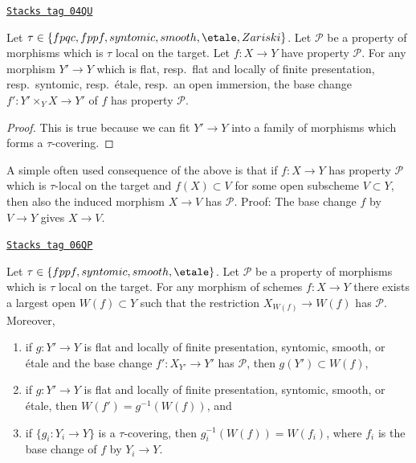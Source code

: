 \begin{lemma}
\label{descent-lemma-pullback-property-local-target}
\href{https://stacks.math.columbia.edu/tag/04QU}{\texttt{Stacks tag 04QU}}

Let $\tau \in \{fpqc, fppf, syntomic, smooth, \etale, Zariski\}$.
Let $\mathcal{P}$ be a property of morphisms which is $\tau$ local
on the target. Let $f : X \to Y$ have property $\mathcal{P}$.
For any morphism $Y' \to Y$ which is
flat, resp.\ flat and locally of finite presentation, resp.\ syntomic,
resp.\ \'etale, resp.\ an open immersion, the base change
$f' : Y' \times_Y X \to Y'$ of $f$ has property $\mathcal{P}$.
\end{lemma}

\begin{proof}
This is true because we can fit $Y' \to Y$ into a family of
morphisms which forms a $\tau$-covering.
\end{proof}

A simple often used consequence of the above is that if
$f : X \to Y$ has property $\mathcal{P}$ which is $\tau$-local
on the target and $f(X) \subset V$
for some open subscheme $V \subset Y$, then also the induced
morphism $X \to V$ has $\mathcal{P}$. Proof: The base change
$f$ by $V \to Y$ gives $X \to V$.

\begin{lemma}
\label{descent-lemma-largest-open-of-the-base}
\href{https://stacks.math.columbia.edu/tag/06QP}{\texttt{Stacks tag 06QP}}

Let $\tau \in \{fppf, syntomic, smooth, \etale\}$.
Let $\mathcal{P}$ be a property of morphisms which is $\tau$ local
on the target. For any morphism of schemes $f : X \to Y$ there exists
a largest open $W(f) \subset Y$ such that the restriction
$X_{W(f)} \to W(f)$ has $\mathcal{P}$. Moreover,
\begin{enumerate}
\item if $g : Y' \to Y$ is flat and locally of finite presentation,
syntomic, smooth, or \'etale and the base change $f' : X_{Y'} \to Y'$
has $\mathcal{P}$, then $g(Y') \subset W(f)$,
\item if $g : Y' \to Y$ is flat and locally of finite presentation,
syntomic, smooth, or \'etale, then $W(f') = g^{-1}(W(f))$, and
\item if $\{g_i : Y_i \to Y\}$ is a $\tau$-covering, then
$g_i^{-1}(W(f)) = W(f_i)$, where $f_i$ is the base change of $f$
by $Y_i \to Y$.
\end{enumerate}
\end{lemma}

